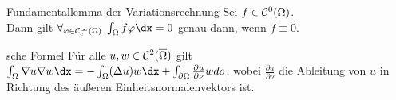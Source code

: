 \begin{Lemma}{Fundamentallemma der Variationsrechnung}
    Sei $f \in \mathcal{C}^0(\Omega)$.\\
    Dann gilt $\forall_{\varphi \in \C^\infty_c(\Omega)}\; \int_\Omega f\varphi \dx = 0$
    genau dann, wenn $f \equiv 0$.
\end{Lemma}

\begin{Lemma}{sche Formel}
    Für alle $u, w \in \mathcal{C}^2(\overline{\Omega})$ gilt\\
    $\int_\Omega \nabla u \nabla w \dx = -\int_\Omega (\Delta u) w \dx
    + \int_{\partial \Omega} \frac{\partial u}{\partial \nu} w do$,
    wobei $\frac{\partial u}{\partial \nu}$ die Ableitung von $u$ in Richtung des äußeren
    Einheitsnormalenvektors ist.
\end{Lemma}

\linie

